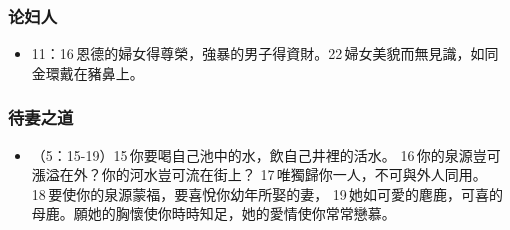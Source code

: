 \subsubsection{论妇人}
\begin{itemize}
\itemsep-.45em 
\item 11：16 恩德的婦女得尊榮，強暴的男子得資財。22 婦女美貌而無見識，如同金環戴在豬鼻上。
\end{itemize}
\subsubsection{待妻之道}
\begin{itemize}
\itemsep-.45em 
\item （5：15-19）15 你要喝自己池中的水，飲自己井裡的活水。 16 你的泉源豈可漲溢在外？你的河水豈可流在街上？ 17 唯獨歸你一人，不可與外人同用。 18 要使你的泉源蒙福，要喜悅你幼年所娶的妻， 19 她如可愛的麀鹿，可喜的母鹿。願她的胸懷使你時時知足，她的愛情使你常常戀慕。
\end{itemize}

